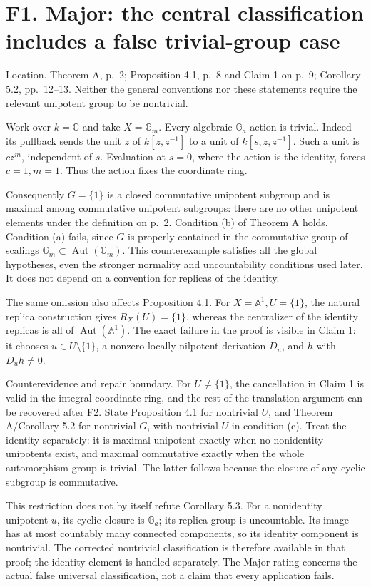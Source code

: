 \documentclass[10pt]{article}
\begin{document}
\section*{F1. Major: the central classification includes a false trivial-group case}
Location. Theorem A, p. 2; Proposition 4.1, p. 8 and Claim 1 on p. 9; Corollary 5.2, pp. 12–13. Neither the general conventions nor these statements require the relevant unipotent group to be nontrivial.\par
Work over \(k=\mathbb C\) and take \(X=\mathbb G_m\). Every algebraic \(\mathbb G_a\)-action is trivial. Indeed its pullback sends the unit \(z\) of \(k[z,z^{-1}]\) to a unit of \(k[s,z,z^{-1}]\). Such a unit is \(c z^m\), independent of \(s\). Evaluation at \(s=0\), where the action is the identity, forces \(c=1,m=1\). Thus the action fixes the coordinate ring.\par
Consequently \(G=\{1\}\) is a closed commutative unipotent subgroup and is maximal among commutative unipotent subgroups: there are no other unipotent elements under the definition on p. 2. Condition (b) of Theorem A holds. Condition (a) fails, since \(G\) is properly contained in the commutative group of scalings \(\mathbb G_m\subset\operatorname{Aut}(\mathbb G_m)\). This counterexample satisfies all the global hypotheses, even the stronger normality and uncountability conditions used later. It does not depend on a convention for replicas of the identity.\par
The same omission also affects Proposition 4.1. For \(X=\mathbb A^1,U=\{1\}\), the natural replica construction gives \(R_X(U)=\{1\}\), whereas the centralizer of the identity replicas is all of \(\operatorname{Aut}(\mathbb A^1)\). The exact failure in the proof is visible in Claim 1: it chooses \(u\in U\setminus\{1\}\), a nonzero locally nilpotent derivation \(D_u\), and \(h\) with \(D_u h\ne0\).\par
Counterevidence and repair boundary. For \(U\ne\{1\}\), the cancellation in Claim 1 is valid in the integral coordinate ring, and the rest of the translation argument can be recovered after F2. State Proposition 4.1 for nontrivial \(U\), and Theorem A/Corollary 5.2 for nontrivial \(G\), with nontrivial \(U\) in condition (c). Treat the identity separately: it is maximal unipotent exactly when no nonidentity unipotents exist, and maximal commutative exactly when the whole automorphism group is trivial. The latter follows because the closure of any cyclic subgroup is commutative.\par
This restriction does not by itself refute Corollary 5.3. For a nonidentity unipotent \(u\), its cyclic closure is \(\mathbb G_a\); its replica group is uncountable. Its image has at most countably many connected components, so its identity component is nontrivial. The corrected nontrivial classification is therefore available in that proof; the identity element is handled separately. The Major rating concerns the actual false universal classification, not a claim that every application fails.\par
\end{document}
